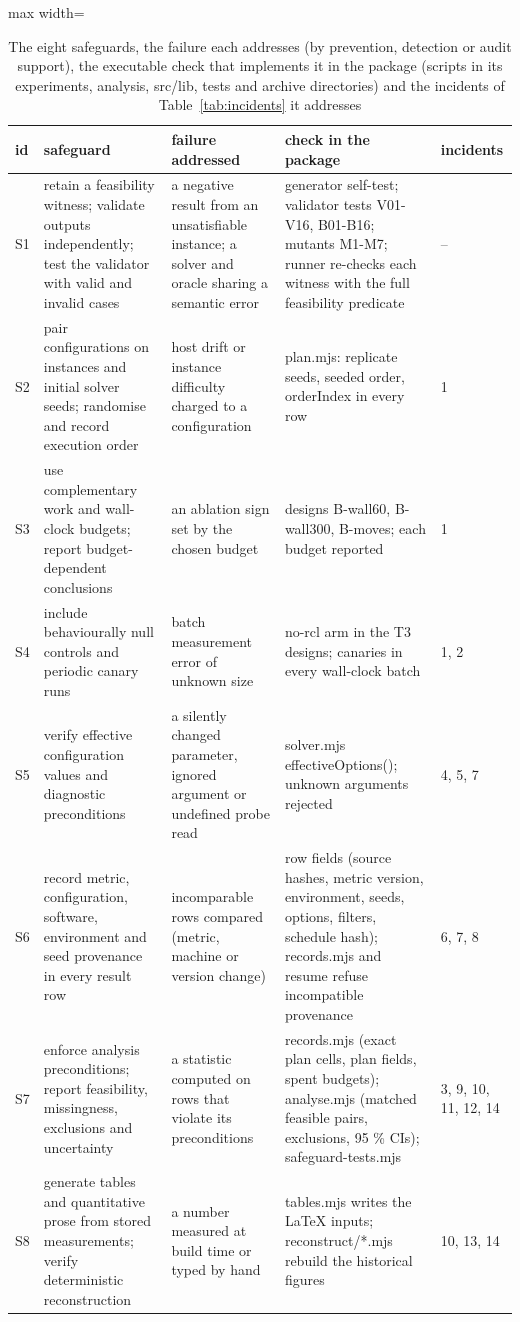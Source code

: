 \begin{table}[t]
\centering
\caption{The eight safeguards, the failure each addresses (by prevention, detection or audit support), the
executable check that implements it in the package (scripts in its experiments, analysis, src/lib, tests and archive
directories) and the incidents of Table~\ref{tab:incidents} it addresses}
\label{tab:safeguards}
\footnotesize
\begin{adjustbox}{max width=\textwidth}
\begin{tabular}{@{}l p{50mm} p{46mm} p{50mm} l@{}}
\toprule
id & safeguard & failure addressed & check in the package & incidents \\
\midrule
S1 & retain a feasibility witness; validate outputs independently; test the validator with valid and invalid cases & a negative result from an unsatisfiable instance; a solver and oracle sharing a semantic error & generator self-test; validator tests V01-V16, B01-B16; mutants M1-M7; runner re-checks each witness with the full feasibility predicate & -- \\
S2 & pair configurations on instances and initial solver seeds; randomise and record execution order & host drift or instance difficulty charged to a configuration & plan.mjs: replicate seeds, seeded order, orderIndex in every row & 1 \\
S3 & use complementary work and wall-clock budgets; report budget-dependent conclusions & an ablation sign set by the chosen budget & designs B-wall60, B-wall300, B-moves; each budget reported & 1 \\
S4 & include behaviourally null controls and periodic canary runs & batch measurement error of unknown size & no-rcl arm in the T3 designs; canaries in every wall-clock batch & 1, 2 \\
S5 & verify effective configuration values and diagnostic preconditions & a silently changed parameter, ignored argument or undefined probe read & solver.mjs effectiveOptions(); unknown arguments rejected & 4, 5, 7 \\
S6 & record metric, configuration, software, environment and seed provenance in every result row & incomparable rows compared (metric, machine or version change) & row fields (source hashes, metric version, environment, seeds, options, filters, schedule hash); records.mjs and resume refuse incompatible provenance & 6, 7, 8 \\
S7 & enforce analysis preconditions; report feasibility, missingness, exclusions and uncertainty & a statistic computed on rows that violate its preconditions & records.mjs (exact plan cells, plan fields, spent budgets); analyse.mjs (matched feasible pairs, exclusions, 95 \% CIs); safeguard-tests.mjs & 3, 9, 10, 11, 12, 14 \\
S8 & generate tables and quantitative prose from stored measurements; verify deterministic reconstruction & a number measured at build time or typed by hand & tables.mjs writes the LaTeX inputs; reconstruct/*.mjs rebuild the historical figures & 10, 13, 14 \\
\bottomrule
\end{tabular}
\end{adjustbox}
\end{table}
